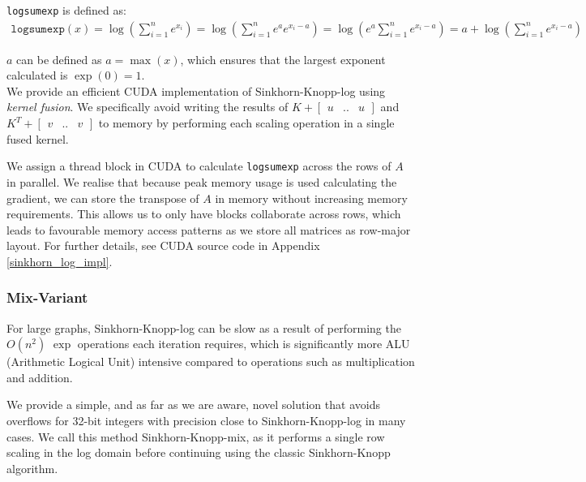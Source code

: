 \texttt{logsumexp} is defined as:
\begin{equation}
    \begin{split}
        \texttt{logsumexp}(x) = \log(\sum_{i = 1}^n e^{x_i}) = \log(\sum_{i = 1}^n e^a e^{x_i - a}) = \log(e^a \sum_{i = 1}^ne^{x_i - a}) = a +\log(\sum_{i = 1}^ne^{x_i - a})
    \end{split}
\end{equation}

$a$ can be defined as $a = \max(x)$, which ensures that the largest exponent calculated is $\exp(0) = 1$. \\

We provide an efficient CUDA implementation of Sinkhorn-Knopp-log using \textit{kernel fusion}. We specifically avoid writing the results of $K + \begin{bmatrix} u & .. & u \end{bmatrix}$ and $K^T + \begin{bmatrix} v & .. & v \end{bmatrix}$ to memory by performing each scaling operation in a single fused kernel.

We assign a thread block in CUDA to calculate \texttt{logsumexp} across the rows of $A$ in parallel. We realise that because peak memory usage is used calculating the gradient, we can store the transpose of $A$ in memory without increasing memory requirements. This allows us to only have blocks collaborate across rows, which leads to favourable memory access patterns as we store all matrices as row-major layout. For further details, see CUDA source code in Appendix \ref{sinkhorn_log_impl}.

\subsubsection{Mix-Variant}
For large graphs, Sinkhorn-Knopp-log can be slow as a result of performing the $O(n^2)$ $\exp$ operations each iteration requires, which is significantly more ALU (Arithmetic Logical Unit) intensive compared to operations such as multiplication and addition.

We provide a simple, and as far as we are aware, novel solution that avoids overflows for 32-bit integers with precision close to Sinkhorn-Knopp-log in many cases. We call this method Sinkhorn-Knopp-mix, as it performs a single row scaling in the log domain before continuing using the classic Sinkhorn-Knopp algorithm.

